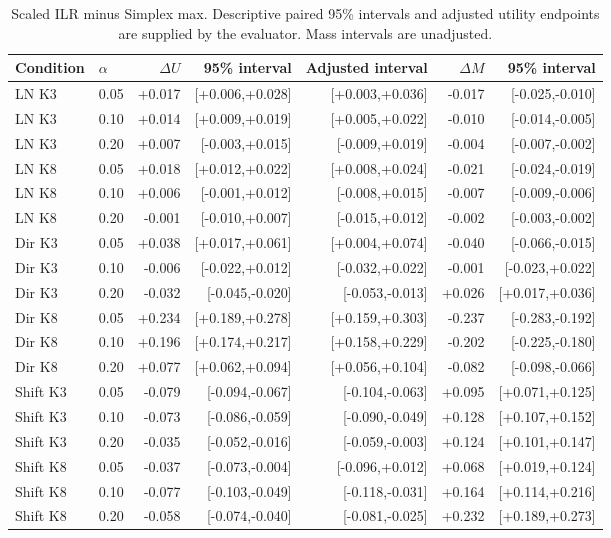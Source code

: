 \documentclass{article}
\begin{document}
\begin{table}[p]
\centering\scriptsize
\caption{Scaled ILR minus Simplex max. Descriptive paired 95\% intervals and adjusted utility endpoints are supplied by the evaluator. Mass intervals are unadjusted.}
\begin{tabular}{llrrrrr}
\toprule
Condition & $\alpha$ & $\Delta U$ & 95\% interval & Adjusted interval & $\Delta M$ & 95\% interval \\
\midrule
LN K3 & 0.05 & +0.017 & [+0.006,+0.028] & [+0.003,+0.036] & -0.017 & [-0.025,-0.010] \\
LN K3 & 0.10 & +0.014 & [+0.009,+0.019] & [+0.005,+0.022] & -0.010 & [-0.014,-0.005] \\
LN K3 & 0.20 & +0.007 & [-0.003,+0.015] & [-0.009,+0.019] & -0.004 & [-0.007,-0.002] \\
LN K8 & 0.05 & +0.018 & [+0.012,+0.022] & [+0.008,+0.024] & -0.021 & [-0.024,-0.019] \\
LN K8 & 0.10 & +0.006 & [-0.001,+0.012] & [-0.008,+0.015] & -0.007 & [-0.009,-0.006] \\
LN K8 & 0.20 & -0.001 & [-0.010,+0.007] & [-0.015,+0.012] & -0.002 & [-0.003,-0.002] \\
Dir K3 & 0.05 & +0.038 & [+0.017,+0.061] & [+0.004,+0.074] & -0.040 & [-0.066,-0.015] \\
Dir K3 & 0.10 & -0.006 & [-0.022,+0.012] & [-0.032,+0.022] & -0.001 & [-0.023,+0.022] \\
Dir K3 & 0.20 & -0.032 & [-0.045,-0.020] & [-0.053,-0.013] & +0.026 & [+0.017,+0.036] \\
Dir K8 & 0.05 & +0.234 & [+0.189,+0.278] & [+0.159,+0.303] & -0.237 & [-0.283,-0.192] \\
Dir K8 & 0.10 & +0.196 & [+0.174,+0.217] & [+0.158,+0.229] & -0.202 & [-0.225,-0.180] \\
Dir K8 & 0.20 & +0.077 & [+0.062,+0.094] & [+0.056,+0.104] & -0.082 & [-0.098,-0.066] \\
Shift K3 & 0.05 & -0.079 & [-0.094,-0.067] & [-0.104,-0.063] & +0.095 & [+0.071,+0.125] \\
Shift K3 & 0.10 & -0.073 & [-0.086,-0.059] & [-0.090,-0.049] & +0.128 & [+0.107,+0.152] \\
Shift K3 & 0.20 & -0.035 & [-0.052,-0.016] & [-0.059,-0.003] & +0.124 & [+0.101,+0.147] \\
Shift K8 & 0.05 & -0.037 & [-0.073,-0.004] & [-0.096,+0.012] & +0.068 & [+0.019,+0.124] \\
Shift K8 & 0.10 & -0.077 & [-0.103,-0.049] & [-0.118,-0.031] & +0.164 & [+0.114,+0.216] \\
Shift K8 & 0.20 & -0.058 & [-0.074,-0.040] & [-0.081,-0.025] & +0.232 & [+0.189,+0.273] \\
\bottomrule
\end{tabular}
\end{table}
\end{document}
